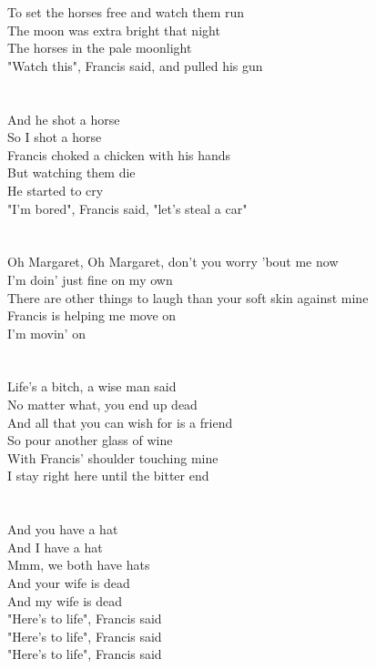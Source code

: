 {{To set the horses free and watch them run\\
The moon was extra bright that night\\
The horses in the pale moonlight\\
"Watch this", Francis said, and pulled his gun}\\
\\\noindent\vbox{~\\
And he shot a horse\\
So I shot a horse\\
Francis choked a chicken with his hands\\
But watching them die\\
He started to cry\\
"I'm bored", Francis said, "let's steal a car"}\\
\\\noindent\vbox{~\\
Oh Margaret, Oh Margaret, don't you worry 'bout me now\\
I'm doin' just fine on my own\\
There are other things to laugh than your soft skin against mine\\
Francis is helping me move on\\
I'm movin' on}\\
\\\noindent\vbox{~\\
Life's a bitch, a wise man said\\
No matter what, you end up dead\\
And all that you can wish for is a friend\\
So pour another glass of wine\\
With Francis' shoulder touching mine\\
I stay right here until the bitter end}\\
\\\noindent\vbox{~\\
And you have a hat\\
And I have a hat\\
Mmm, we both have hats\\
And your wife is dead\\
And my wife is dead\\
"Here's to life", Francis said\\
"Here's to life", Francis said\\
"Here's to life", Francis said}
}


